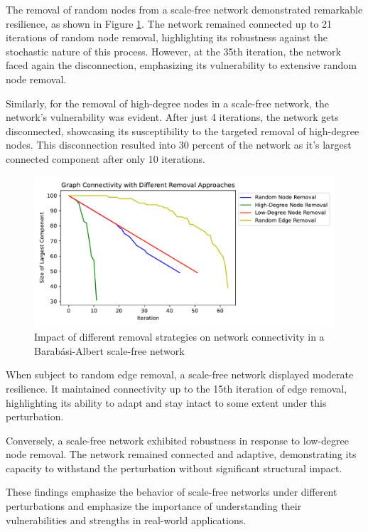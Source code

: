 \documentclass[conference]{IEEEtran} %
\begin{document}
The removal of random nodes from a scale-free network demonstrated remarkable resilience, as shown in Figure \ref{fig:12.2}. The network remained connected up to 21 iterations of random node removal, highlighting its robustness against the stochastic nature of this process. However, at the 35th iteration, the network faced again the disconnection, emphasizing its vulnerability to extensive random node removal.

Similarly, for the removal of high-degree nodes in a scale-free network, the network's vulnerability was evident. After just 4 iterations, the network gets disconnected, showcasing its susceptibility to the targeted removal of high-degree nodes. This disconnection resulted into 30 percent of the network as it's largest connected component after only 10 iterations.

\begin{figure}[t]
  \centering
  \includegraphics[width=1\linewidth]{scale_free_network_connectivity_plot.pdf}
  \caption{Impact of different removal strategies on network connectivity in a Barabási-Albert scale-free network}
  \label{fig:12.2}
\end{figure}

When subject to random edge removal, a scale-free network displayed moderate resilience. It maintained connectivity up to the 15th iteration of edge removal, highlighting its ability to adapt and stay intact to some extent under this perturbation.

Conversely, a scale-free network exhibited robustness in response to low-degree node removal. The network remained connected and adaptive, demonstrating its capacity to withstand the perturbation without significant structural impact.

These findings emphasize the behavior of scale-free networks under different perturbations and emphasize the importance of understanding their vulnerabilities and strengths in real-world applications.
\end{document}
